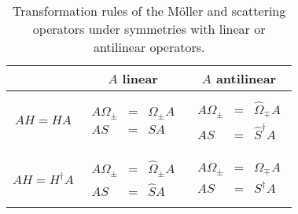 \begin{table}
  \centering
  \begin{tabular}{|c|c|c|}
  \hline
   & \textbf{$A$ linear} & \textbf{$A$ antilinear}

  \\
  \hline

  $A H = H A$
  &
  $
  \begin{array}{ccc}
    &&
    \\
    A \Omega_{\pm}&=&\Omega_{\pm} A
    \\
    A S&=&S A
    \\
    &&
  \end{array}
  $
  &
  $
  \begin{array}{ccc}
    &&
    \\
    A \Omega_{\pm}&=&\widehat{\Omega}_{\mp} A
    \\
    A S&=&\widehat{S}^\dagger A
    \\
    &&
  \end{array}
  $
  \\
  \hline

  $A H = H^\dagger A$
  &
  $
  \begin{array}{ccc}
    &&
    \\
    A \Omega_{\pm}&=&\widehat{\Omega}_{\pm} A
    \\
    A S&=&\widehat{S} A
    \\
    &&
  \end{array}
  $
  &
  $
  \begin{array}{ccc}
    &&
    \\
    A \Omega_{\pm}&=&\Omega_{\mp} A
    \\
    A S&=&S^\dagger A
    \\
    &&
  \end{array}
  $
  \\
  \hline
  \end{tabular}
  \caption{Transformation rules of the M\"oller and scattering operators under
symmetries with linear or antilinear operators.}
   \label{tab:MollerOperatorSyms}
\end{table}

